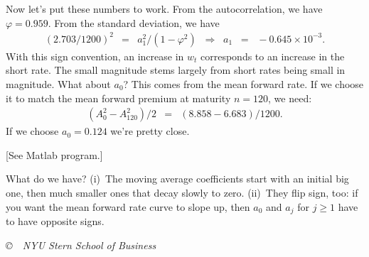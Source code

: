 \documentclass[11pt]{article}
\begin{document}
Now let's put these numbers to work.
From the autocorrelation, we have $\varphi = 0.959$.
From the standard deviation, we have
\begin{eqnarray*}
    (2.703/1200)^2 &=&  a_1^2/(1-\varphi^2)
            \;\;\Rightarrow\;\; a_1 \;\;=\;\; - 0.645 \times 10^{-3} .
\end{eqnarray*}
With this sign convention, an increase in $w_t$ corresponds to an
increase in the short rate.
The small magnitude stems largely from short rates being small in magnitude.
What about $a_0$?  This comes from the mean forward rate.
If we choose it to match the mean forward premium at maturity $n=120$,
we need:
\begin{eqnarray*}
    (A_0^2 - A_{120}^2)/2 &=& (8.858 - 6.683)/1200 .
\end{eqnarray*}
If we choose $a_0 = 0.124$ we're pretty close.

[See Matlab program.]

What do we have?
(i)~The moving average coefficients start with an initial big one,
then much smaller ones that decay slowly to zero.
(ii)~They flip sign, too:  if you want the mean forward rate curve to slope up,
then $a_0$ and $a_j$ for $j\geq 1$ have to have opposite signs.


\begin{comment}
\subsection*{The expectations hypothesis}

Martingales...





\end{comment}


\vfill \centerline{\it \copyright \ \number\year \
NYU Stern School of Business}
\end{document}
